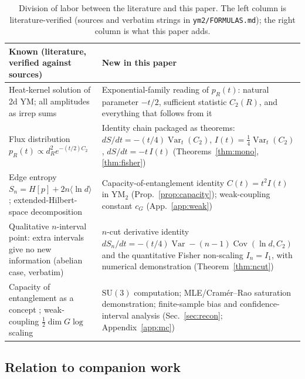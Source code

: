 \documentclass[11pt]{article}
\theoremstyle{remark}
\theoremstyle{plain}
\newcommand{\Var}{\operatorname{Var}}
\newcommand{\Cov}{\operatorname{Cov}}
\newcommand{\dG}{\dim G}
\begin{document}
\begin{table}[t]
\centering
\small
\begin{tabular}{p{}p{}}
\toprule
\textbf{Known (literature, verified against sources)} & \textbf{New in this paper} \\
\midrule
Heat-kernel solution of 2d YM; all amplitudes as irrep sums \cite{Mig75, Rus90, Wit91, CMR94} & Exponential-family reading of $p_R(t)$: natural parameter $-t/2$, sufficient statistic $C_2(R)$, and everything that follows from it \\[3pt]
Flux distribution $p_R(t) \propto d_R^2 e^{-(t/2)C_2}$ \cite[eq.~(pr)]{D14} & Identity chain packaged as theorems: $dS/dt = -(t/4)\Var_t(C_2)$, $I(t) = \tfrac14\Var_t(C_2)$, $dS/dt = -t\,I(t)$ (Theorems~\ref{thm:mono}, \ref{thm:fisher}) \\[3pt]
Edge entropy $S_n = H[p] + 2n\langle\ln d\rangle$ \cite{D14, GS14, V08}; extended-Hilbert-space decomposition \cite{D11, CHR, GST15} & Capacity-of-entanglement identity $C(t) = t^2 I(t)$ in YM$_2$ (Prop.~\ref{prop:capacity}); weak-coupling constant $c_G$ (App.~\ref{app:weak}) \\[3pt]
Qualitative $n$-interval point: extra intervals give no new information (abelian case, verbatim) \cite{D14} & $n$-cut derivative identity $dS_n/dt = -(t/4)\Var - (n-1)\Cov(\ln d, C_2)$ and the quantitative Fisher non-scaling $I_n = I_1$, with numerical demonstration (Theorem~\ref{thm:ncut}) \\[3pt]
Capacity of entanglement as a concept \cite{YQ10, dBJK18}; weak-coupling $\tfrac12\dG\log$ scaling \cite{GS14, R15} & $\mathrm{SU}(3)$ computation; MLE/Cram\'er--Rao saturation demonstration; finite-sample bias and confidence-interval analysis (Sec.~\ref{sec:recon}; Appendix~\ref{app:mc}) \\
\bottomrule
\end{tabular}
\caption{Division of labor between the literature and this paper. The left column is literature-verified (sources and verbatim strings in \texttt{ym2/FORMULAS.md}); the right column is what this paper adds.}
\label{tab:novelty}
\end{table}

\subsection{Relation to companion work}\label{sec:companion}
\end{document}
